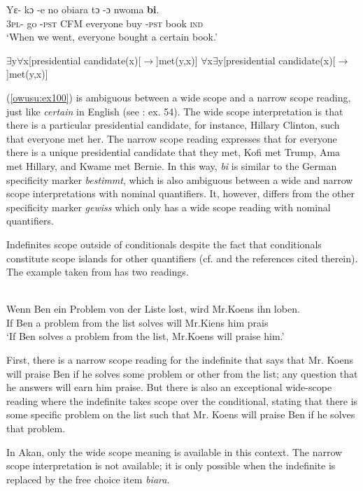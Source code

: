 \documentclass[output=paper,modfonts,nonflat,draftmode]{langsci/langscibook}
\begin{document}
\ex\label{owusu:ex15:2}
\gll  Yε- kɔ -e no obiara tɔ -ɔ  nwoma \textbf{bi}.\\
\textsc{3pl}- go -\textsc{pst}  CFM everyone buy -\textsc{pst} book \textsc{ind} \\
\glt `When we went, everyone bought a certain book.'
\z \z
 
 \ea
 \ea
$\exists$y$\forall$x[presidential candidate(x)[$\rightarrow$]met(y,x)]
\ex $\forall$x$\exists$y[presidential candidate(x)[$\rightarrow$]met(y,x)] 
\z\z

(\ref{owusu:ex100}) is ambiguous between a wide scope and a narrow scope reading, just like \emph{certain} in English  (see \citealt{Farkas2002}: ex. 54). The wide scope interpretation is that there is a particular presidential candidate, for instance, Hillary Clinton, such that everyone met her. The narrow scope reading expresses that for everyone there is a unique presidential candidate that they met, Kofi met Trump, Ama met Hillary, and Kwame met Bernie. In this way, \emph{bi} is similar to the German specificity marker \emph{bestimmt}, which is also ambiguous between a wide and narrow scope interpretations with nominal quantifiers. It, however, differs from the other specificity marker \emph{gewiss} which only has a wide scope reading with nominal quantifiers.               
  
  Indefinites scope outside of conditionals despite the fact that conditionals constitute scope islands for other quantifiers (cf. \citealt{FodorSag1982,Endriss2009} and the references cited therein). The example taken from \citet{Farkas2002} has two readings.

\ea\label{owusu:ex14}\\
\gll Wenn Ben ein Problem von der Liste lost, wird Mr.Koens ihn loben. \\
    If Ben a problem from the list solves will Mr.Kiens him prais\\
\glt `If Ben solves a problem from the list, Mr.Koens will praise him.'
\z

First, there is a narrow scope reading for the indefinite that says that  Mr. Koens will praise Ben if he solves some problem or other from the list; any question that he answers will earn him praise. But there is also an exceptional wide-scope reading where the indefinite takes scope over the conditional, stating that there is some specific problem on the list such that Mr. Koens will praise Ben if he solves that problem. 

In Akan, only the wide scope meaning is available in this context. The narrow scope interpretation is not available; it is only possible when the indefinite is replaced by the free choice item \emph{biara}.
\end{document}
